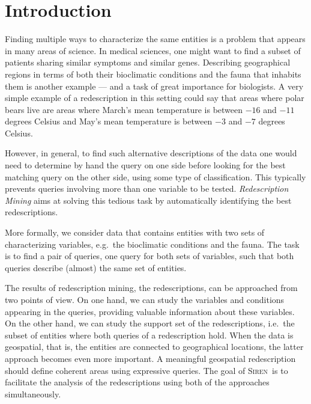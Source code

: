 \documentclass{sig-alternate}
\newcommand{\note}[1]{{\color{red}#1}}
\newcommand{\Siren}{\textsc{Siren}}
\begin{document}

\section{Introduction}
Finding multiple ways to characterize the same entities is a problem
that appears in many areas of science.  In medical sciences, one might
want to find a subset of patients sharing similar symptoms and similar
genes. Describing geographical regions in terms of both their
bioclimatic conditions and the fauna that inhabits them is another
example --- and a task of great importance for biologists.
 A very
simple example of a redescription in this setting could say that
areas where polar bears live are areas where March's mean temperature
is between $-16$ and $-11$ degrees Celsius and May's mean temperature
is between $-3$ and $-7$ degrees Celsius.

However, in general, to find such alternative descriptions of the data
one would need to determine by hand the query on one side before
looking for the best matching query on the other side, using some type
of classification. This typically prevents queries involving more than
one variable to be tested. \emph{Redescription Mining} aims at
solving this tedious task by automatically identifying the best
redescriptions.

More formally, we consider data that contains entities with two sets
of characterizing variables, e.g.\ the bioclimatic conditions and the
fauna. The task is to find a pair of queries, one query for both sets
of variables, such that both queries describe (almost) the same set of
entities.

The results of redescription mining, the redescriptions, can be
approached from two points of view. On one hand, we can study the
variables and conditions appearing in the queries, providing
valuable information about these variables. On the other hand, we can
study the support set of the redescriptions, i.e.\ the subset of
entities where both queries of a redescription hold. When the data
is geospatial, that is, the entities are connected to geographical locations, the
latter approach becomes even more important. A meaningful geospatial
redescription should define coherent areas using expressive
queries. The goal of \Siren\ is to facilitate the analysis of the
redescriptions using both of the approaches simultaneously.
\end{document}
